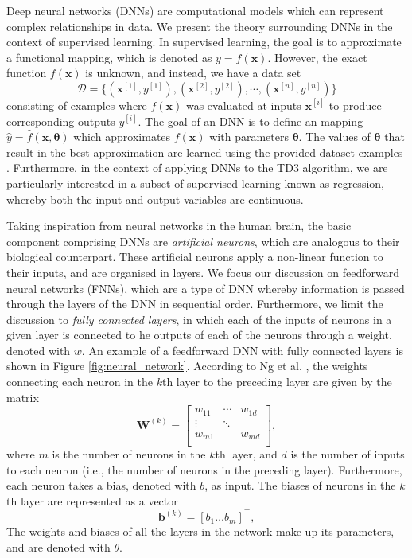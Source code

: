 Deep neural networks (DNNs) are computational models which can represent complex relationships in data.
We present the theory surrounding DNNs in the context of supervised learning.
In supervised learning, the goal is to approximate a functional mapping, which is denoted as $y=f(\bm{x})$.
However, the exact function $f(\bm{x})$ is unknown,  and instead, we have a data set
\begin{equation}\label{eq:supdervised_dataset}
    \mathcal{D} = \{ (\bm{x}^{[1]}, y^{[1]}), (\bm{x}^{[2]}, y^{[2]}), \cdots, (\bm{x}^{[n]}, y^{[n]}) \}
\end{equation}
consisting of examples where $f(\bm{x})$ was evaluated at inputs $\bm{x}^{[i]}$ to produce corresponding outputs $y^{[i]}$.
The goal of an DNN is to define an mapping $\hat{y}=\hat{f}(\bm{x},\bm{\theta})$ which approximates $f(\bm{x})$ with parameters $\bm{\theta}$.
The values of $\bm{\theta}$ that result in the best approximation are learned using the provided dataset examples \cite{Goodfellow2016}.
Furthermore, in the context of applying DNNs to the TD3 algorithm, we are particularly interested in a subset of supervised learning known as regression, whereby both the input and output variables are continuous.


Taking inspiration from neural networks in the human brain, the basic component comprising DNNs are \emph{artificial neurons}, which are analogous to their biological counterpart.
These artificial neurons apply a non-linear function to their inputs, and are organised in layers.
We focus our discussion on feedforward neural networks (FNNs), which are a type of DNN whereby information is passed through the layers of the DNN in sequential order.
Furthermore, we limit the discussion to \emph{fully connected layers}, in which each of the inputs of neurons in a given layer is connected to he outputs of each of the neurons through a weight, denoted with $w$.
An example of a feedforward DNN with fully connected layers is shown in Figure \ref{fig:neural_network}.
According to Ng et al. \cite{Ng2019}, the weights connecting each neuron in the $k$th layer to the preceding layer are given by the matrix
\begin{equation}
    \mathbf{W}^{(k)} = 
    \begin{bmatrix}
        w_{11} & \cdots &  w_{1d}   \\
        \vdots & \ddots &           \\
        w_{m1} &        & w_{md}    \\
    \end{bmatrix}, 
\end{equation}
where $m$ is the number of neurons in the $k$th layer, and $d$ is the number of inputs to each neuron (i.e., the number of neurons in the preceding layer).
Furthermore, each neuron takes a bias, denoted with $b$, as input. 
The biases of neurons in the $k$th layer are represented as a vector
\begin{equation}
    \mathbf{b}^{(k)} = [ b_1 \ldots b_m ]^\intercal,
\end{equation}
The weights and biases of all the layers in the network make up its parameters, and are denoted with $\theta$.

